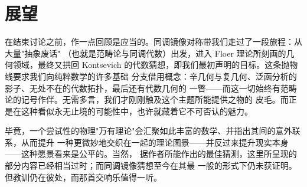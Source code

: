 \clearpage
\section*{展望}

在结束讨论之前，作一点回顾是应当的。同调镜像对称带我们走过了一段旅程：从大量"抽象废话"
（也就是范畴论与同调代数）出发，进入 Floer 理论所刻画的几何领域，最终又拱回
Kontsevich 的代数猜想，即我们最初声明的目标。这条抛物线要求我们向纯粹数学的许多基础
分支借用概念：辛几何与复几何、泛函分析的影子、无处不在的代数拓扑，最后还有代数几何的
一瞥——而这一切始终有范畴论的记号作伴。无需多言，我们才刚刚触及这个主题所能提供之物的
皮毛。而正是在这种看似永无止境的可能性中，也许就藏着它不可否认的魅力。

毕竟，一个尝试性的物理"万有理论"会汇聚如此丰富的数学、并指出其间的意外联系，从而提升
一种更微妙地交织在一起的理论图景——并反过来提升现实本身——这种愿景看来是公平的。当然，
据作者所能作出的最佳猜测，这里所呈现的部分内容已经相当过时；而同调镜像猜想至今在其最
一般的形式下仍未获证明。但教训仍在彼处，而那首交响乐值得一听。


